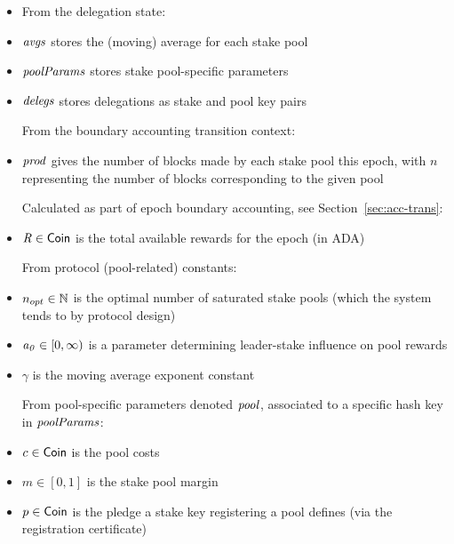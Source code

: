 \begin{itemize}
\item[] From the delegation state:
\item $\mathit{avgs}$ stores the (moving) average for each
stake pool
\item $\mathit{poolParams}$ stores stake pool-specific parameters
\item $\mathit{delegs}$ stores delegations as stake and pool key pairs \medskip

From the boundary accounting transition context:
\item $\mathit{prod}$ gives the number of blocks made by each stake pool
this epoch, with $n$ representing the number of blocks corresponding to the
given pool \medskip

Calculated as part of epoch boundary accounting, see
Section~\ref{sec:acc-trans}:
\item $\mathit{R} \in \mathsf{Coin}$ is the total available rewards for the epoch (in ADA) \medskip

From protocol (pool-related) constants:
\item $n_{opt} \in \mathbb{N}$ is the optimal number of saturated stake pools (which the system
tends to by protocol design)
\item $\mathit{a_0} \in [0, \infty)$ is a parameter determining leader-stake
influence on pool rewards
\item $\gamma$ is the moving average exponent constant \medskip

From pool-specific parameters denoted $\mathit{pool}$, associated to a specific
hash key in $\mathit{poolParams}$:
\item $c \in \mathsf{Coin}$ is the pool costs
\item $m \in [0,1]$ is the stake pool margin
\item $p \in \mathsf{Coin}$ is the pledge a stake key registering a pool defines (via
the registration certificate)\medskip


\end{itemize}
